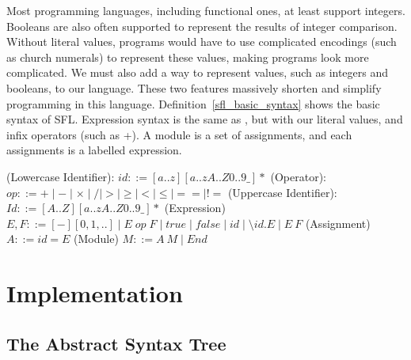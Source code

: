 Most programming languages, including functional ones, at least support integers. Booleans are also often supported to represent the results of integer comparison. Without literal values, programs would have to use complicated encodings (such as church numerals) to represent these values, making programs look more complicated.  We must also add a way to represent values, such as integers and booleans, to our language. 
These two features massively shorten and simplify programming in this language. Definition~\ref{sfl_basic_syntax} shows the basic syntax of \ac{SFL}. Expression syntax is the same as \lcalc, but with our literal values, and infix operators (such as +). A module is a set of assignments, and each assignments is a labelled expression.

\begin{syntax}
(Lowercase Identifier): \(id ::= [a..z][a..zA..Z0..9\_]*\)\newline
(Operator): \(op ::= + \mid - \mid \times \mid / \mid > \mid \ge \mid < \mid \le \mid== \mid \mathrel{\mathtt{!=}} \)\newline
(Uppercase Identifier): \(Id ::= [A..Z][a..zA..Z0..9\_]*\)
\newline\newline\noindent
(Expression) \(E, F ::= [-][0, 1, ..]\mid E\; op\; F \mid true \mid false \mid id \mid \setminus id. E \mid E\:F\)\newline
(Assignment) \(A ::= id = E\)\newline
(Module) \(M ::= A\: M \mid End\)
\label{sfl_basic_syntax}
\end{syntax}



\section{Implementation}
\subsection{The Abstract Syntax Tree}

